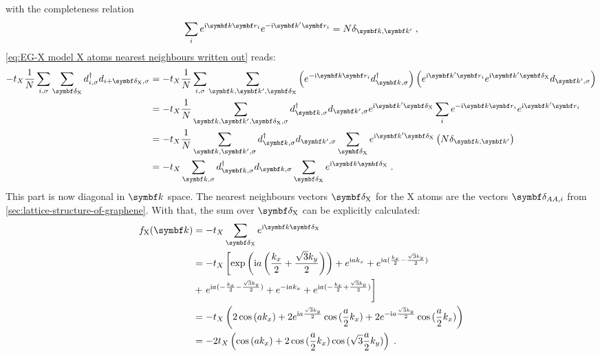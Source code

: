 \documentclass[../main.tex]{subfiles}
\begin{document}
	with the completeness relation
	\begin{equation}
		\sum_{i} e^{\iu \vb{k} \vb{r}_{i}} e^{-\iu \vb{k}^{\prime} \vb{r}_{i}} = N \delta_{\vb{k}, \vb{k}^{\prime}}
		\;,
	\end{equation}
	\cref{eq:EG-X model X atoms nearest neighbours written out} reads:
	\begin{align}
		-t_X \frac{1}{N} \sum_{i,\sigma} \sum_{\vb{\delta}_{\mathrm{X}}} d_{i, \sigma}^{\dagger} d_{i + \vb{\delta}_{\mathrm{X}}, \sigma}
		&= -t_X \frac{1}{N} \sum_{i,\sigma} \sum_{\vb{k}, \vb{k}^{\prime}, \vb{\delta}_{\mathrm{X}}} \left(e^{-\iu \vb{k} \vb{r}_i} d_{\vb{k}, \sigma}^{\dagger} \right) \left(e^{\iu \vb{k}^{\prime} \vb{r}_i} e^{\iu \vb{k}^{\prime} \vb{\delta}_{\mathrm{X}}} d_{\vb{k}^{\prime}, \sigma} \right) \\
		&= -t_X \frac{1}{N} \sum_{\vb{k}, \vb{k^{\prime}}, \vb{\delta}_{\mathrm{X}}, \sigma} d_{\vb{k}, \sigma}^{\dagger}   d_{\vb{k}^{\prime}, \sigma} e^{\iu \vb{k}^{\prime} \vb{\delta}_{\mathrm{X}}} \sum_{i} e^{-\iu \vb{k} \vb{r}_i} e^{\iu \vb{k}^{\prime} \vb{r}_i} \\
		&= -t_X \frac{1}{N} \sum_{\vb{k}, \vb{k^{\prime}}, \sigma}  d_{\vb{k}, \sigma}^{\dagger}  d_{\vb{k}^{\prime}, \sigma} \sum_{\vb{\delta}_{\mathrm{X}}} e^{\iu \vb{k}^{\prime} \vb{\delta}_{\mathrm{X}}} \left(N \delta_{\vb{k}, \vb{k}^{\prime}} \right)\\
		&= -t_X \sum_{\vb{k}, \sigma}  d_{\vb{k}, \sigma}^{\dagger}d_{\vb{k}, \sigma} \sum_{\vb{\delta}_{\mathrm{X}}} e^{\iu \vb{k} \vb{\delta}_{\mathrm{X}}} \;.
	\end{align}
	This part is now diagonal in \(\vb{k}\) space.
	The nearest neighbours vectors \(\vb{\delta}_{\mathrm{X}}\) for the \(\mathrm{X}\) atoms are the vectors \(\vb{\delta}_{AA, i}\) from \cref{sec:lattice-structure-of-graphene}.
	With that, the sum over \(\vb{\delta}_{\mathrm{X}}\) can be explicitly calculated:
	\begin{align}
		f_{\mathrm{X}} (\vb{k}) &= -t_X \sum_{\vb{\delta}_{\mathrm{X}}} e^{\iu \vb{k} \vb{\delta}_{\mathrm{X}}} \\
		&= -t_X \left[ \exp\left(\iu a \left(\frac{k_x}{2} + \frac{\sqrt{3} k_y}{2}\right)\right)
		+ e^{\iu a k_x}
		+ e^{\iu a (\frac{k_x}{2} - \frac{\sqrt{3} k_y}{2})}
		\right. \\
		&+ \left. e^{\iu a (-\frac{k_x}{2} - \frac{\sqrt{3} k_y}{2})}
		+ e^{-\iu a k_x}
		+ e^{\iu a (-\frac{k_x}{2} + \frac{\sqrt{3} k_y}{2})} \right] \\
		&= -t_X \left( 2 \cos{(a k_x)} + 2 e^{\iu a \frac{\sqrt{3} k_y}{2}} \cos{(\frac{a}{2} k_x)} + 2 e^{-\iu a \frac{\sqrt{3} k_y}{2}} \cos{(\frac{a}{2} k_x)} \right) \\
		&= -2t_X \left( \cos{(a k_x)} + 2 \cos{(\frac{a}{2} k_x)} \cos{(\sqrt{3} \frac{ a}{2} k_y)} \right) \;.
	\end{align}
\end{document}
